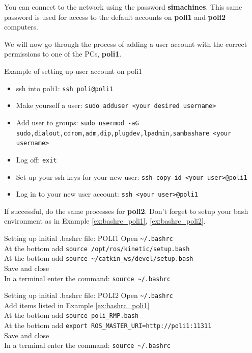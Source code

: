 You can connect to the network using the password \textbf{simachines}. 
This same password is used for access to the default accounts on \textbf{poli1} and \textbf{poli2} computers.

We will now go through the process of adding a user account with the correct permissions to one of the PCs, \textbf{poli1}.

\begin{example}{Example of setting up user account on poli1}
  \label{ex:user_accounts}
  \begin{itemize}
  	\item ssh into poli1: \texttt{ssh poli@poli1}
    \item Make yourself a user: \texttt{sudo adduser <your desired username>}
    \item Add user to groups: \texttt{sudo usermod -aG sudo,dialout,cdrom,adm,dip,plugdev,lpadmin,sambashare <your username>}
	\item  Log off: \texttt{exit}
    \item Set up your ssh keys for your new user: \texttt{ssh-copy-id <your user>@poli1}
	\item Log in to your new user account: \texttt{ssh <your user>@poli1}
  \end{itemize}
\end{example}

If successful, do the same processes for \textbf{poli2}. Don't forget to setup your bash environment as in Example \ref{ex:bashrc_poli1}, \ref{ex:bashrc_poli2}.\\

\begin{example}{Setting up initial .bashrc file: POLI1}
  \label{ex:bashrc_poli1}
    Open \texttt{\textasciitilde/.bashrc} \\
    At the bottom add \texttt{source /opt/ros/kinetic/setup.bash} \\
    At the bottom add \texttt{source \textasciitilde/catkin\_ws/devel/setup.bash} \\
    Save and close \\
    In a terminal enter the command: \texttt{source \textasciitilde/.bashrc}
\end{example}

\begin{example}{Setting up initial .bashrc file: POLI2}
  \label{ex:bashrc_poli2}
    Open \texttt{\textasciitilde/.bashrc} \\
    Add items listed in Example \ref{ex:bashrc_poli1} \\
    At the bottom add \texttt{source poli\_RMP.bash} \\
    At the bottom add \texttt{export ROS\_MASTER\_URI=http://poli1:11311} \\
    Save and close \\
    In a terminal enter the command: \texttt{source \textasciitilde/.bashrc}
\end{example}

